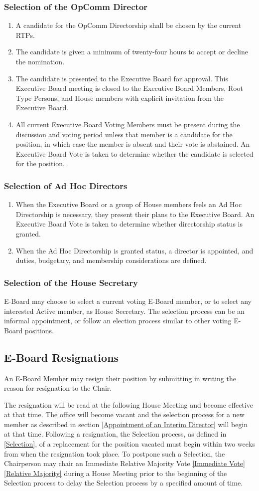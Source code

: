 \documentclass{article}
\newcommand{\asection}[1]{\subsection{#1} \label{#1}}
\newcommand{\asubsection}[1]{\subsubsection{#1} \label{#1}}
\begin{document}
\asubsection{Selection of the OpComm Director}
\begin{enumerate}
	\item A candidate for the OpComm Directorship shall be chosen by the current RTPs.
	\item The candidate is given a minimum of twenty-four hours to accept or decline the nomination.
	\item The candidate is presented to the Executive Board for approval.
		This Executive Board meeting is closed to the Executive Board Members, Root Type Persons, and House members with explicit invitation from the Executive Board.
	\item All current Executive Board Voting Members must be present during the discussion and voting period unless that member is a candidate for the position, in which case the member is absent and their vote is abstained.
		An Executive Board Vote is taken to determine whether the candidate is selected for the position.
\end{enumerate}

\asubsection{Selection of Ad Hoc Directors}
\begin{enumerate}
	\item When the Executive Board or a group of House members feels an Ad Hoc Directorship is necessary, they present their plans to the Executive Board.
  An Executive Board Vote is taken to determine whether directorship status is granted.
	\item When the Ad Hoc Directorship is granted status, a director is appointed, and duties, budgetary, and membership considerations are defined.
\end{enumerate}

\asubsection{Selection of the House Secretary}
E-Board may choose to select a current voting E-Board member, or to select any interested Active member, as House Secretary.
The selection process can be an informal appointment, or follow an election process similar to other voting E-Board positions.

\asection{E-Board Resignations}
An E-Board Member may resign their position by submitting in writing the reason for resignation to the Chair.

The resignation will be read at the following House Meeting and become effective at that time.
The office will become vacant and the selection process for a new member as described in section \ref{Appointment of an Interim Director} will begin at that time.
Following a resignation, the Selection process, as defined in \ref{Selection}, of a replacement for the position vacated must begin within two weeks from when the resignation took place.
To postpone such a Selection, the Chairperson may chair an Immediate Relative Majority Vote \ref{Immediate Vote} \ref{Relative Majority} during a House Meeting prior to the beginning of the Selection process to delay the Selection process by a specified amount of time.
\end{document}
